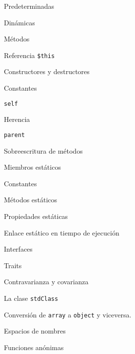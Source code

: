 \begin{longenum}
\begin{longenum}
\begin{longenum}
\begin{longenum}
                \item Predeterminadas
                \item Dinámicas
            \end{longenum}
            \item Métodos
            \begin{longenum}
                \item Referencia \texttt{\$this}
                \item Constructores y destructores
            \end{longenum}
            \item Constantes
            \begin{longenum}
                \item \texttt{self}
            \end{longenum}
            \item Herencia
            \begin{longenum}
                \item \texttt{parent}
                \item Sobreescritura de métodos
            \end{longenum}
            \item Miembros estáticos
            \begin{longenum}
                \item Constantes
                \item Métodos estáticos
                \item Propiedades estáticas
                \item Enlace estático en tiempo de ejecución
            \end{longenum}
            \item Interfaces
            \item Traits
            \item Contravarianza y covarianza
            \item La clase \texttt{stdClass}
            \begin{longenum}
                \item Conversión de \texttt{array} a \texttt{object} y viceversa.
            \end{longenum}
        \end{longenum}
        \item Espacios de nombres
        \item Funciones anónimas
        \begin{longenum}

\end{longenum}
\end{longenum}
\end{longenum}
